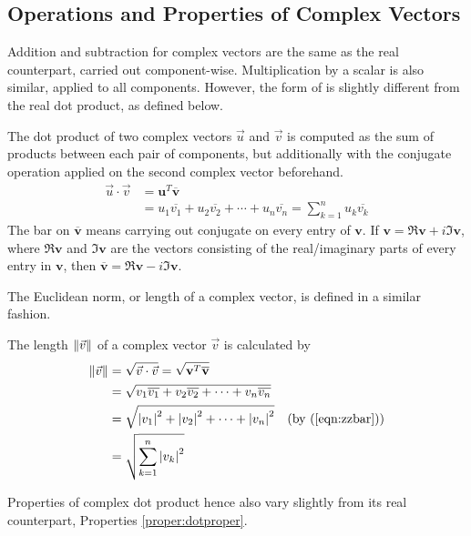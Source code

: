 \subsection{Operations and Properties of Complex Vectors}
Addition and subtraction for complex vectors are the same as the real counterpart, carried out component-wise. Multiplication by a scalar is also similar, applied to all components. However, the form of  is slightly different from the real dot product, as defined below.
\begin{defn}
\label{defn:complexdotproduct}
The dot product of two complex vectors $\vec{u}$ and $\vec{v}$ is computed as the sum of products between each pair of components, but additionally with the conjugate operation applied on the second complex vector beforehand.
\begin{align}
\vec{u} \cdot \vec{v} &= \textbf{u}^T \overline{\textbf{v}} \nonumber \\
&= u_1\overline{v_1} + u_2\overline{v_2} + \cdots + u_n\overline{v_n} = \sum_{k=1}^{n} u_k\overline{v_k}
\end{align}
The bar on $\overline{\textbf{v}}$ means carrying out conjugate on every entry of $\textbf{v}$. If $\textbf{v} = \Re{\textbf{v}} + i\Im{\textbf{v}}$, where $\Re{\textbf{v}}$ and $\Im{\textbf{v}}$ are the vectors consisting of the real/imaginary parts of every entry in $\textbf{v}$, then $\overline{\textbf{v}} = \Re{\textbf{v}} - i\Im{\textbf{v}}$.
\end{defn}
The Euclidean norm, or length of a complex vector, is defined in a similar fashion.
\begin{defn}
The length $\norm{\vec{v}}$ of a complex vector $\vec{v}$ is calculated by
\begin{align}
\norm{\vec{v}} &= \sqrt{\vec{v} \cdot \vec{v}} = \sqrt{\textbf{v}^T \overline{\textbf{v}}} \nonumber \\
&= \sqrt{v_1\overline{v_1} + v_2\overline{v_2} + \cdots + v_n\overline{v_n}} \nonumber\\
&= \sqrt{\abs{v_1}^2 + \abs{v_2}^2 + \cdots + \abs{v_n}^2} & \text{(by (\ref{eqn:zzbar}))} \nonumber \\
&= \sqrt{\sum_{k=1}^{n} \abs{v_k}^2}
\end{align}
\end{defn}
Properties of complex dot product hence also vary slightly from its real counterpart, Properties \ref{proper:dotproper}.
